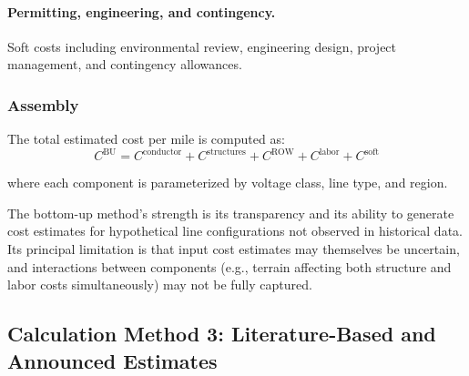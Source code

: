 \documentclass[12pt]{article}
\begin{document}
\paragraph{Permitting, engineering, and contingency.} Soft costs including environmental review, engineering design, project management, and contingency allowances. %

\subsubsection{Assembly}

The total estimated cost per mile is computed as:
\begin{equation}
C^{\text{BU}} = C^{\text{conductor}} + C^{\text{structures}} + C^{\text{ROW}} + C^{\text{labor}} + C^{\text{soft}}
\label{eq:bottomup}
\end{equation}

\noindent where each component is parameterized by voltage class, line type, and region. %

% 

The bottom-up method's strength is its transparency and its ability to generate cost estimates for hypothetical line configurations not observed in historical data. Its principal limitation is that input cost estimates may themselves be uncertain, and interactions between components (e.g., terrain affecting both structure and labor costs simultaneously) may not be fully captured.

\subsection{Calculation Method 3: Literature-Based and Announced Estimates}
\label{sec:literature_estimates}
\end{document}
